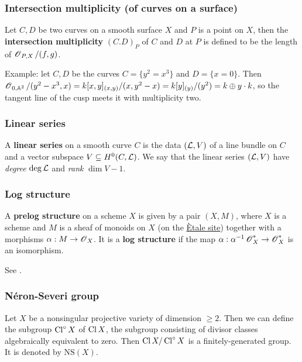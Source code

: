 \documentclass[11pt, english]{article}
\begin{document}
\subsubsection{Intersection multiplicity (of curves on a surface)}
\label{intersectionmult}

Let $C,D$ be two curves on a smooth surface $X$ and $P$ is a point on $X$, then the \textbf{intersection multiplicity} $(C.D)_P$ of $C$ and $D$ at $P$ is defined to be the length of $\operatorname{\mathscr{O}}_{P,X}/(f,g)$.

Example: let $C,D$ be the curves $C= \{ y^2=x^3 \}$ and $D = \{x = 0\}$. Then $\operatorname{\mathscr{O}}_{0,\mathbb{A}^2}/(y^2-x^3,x) = k[x,y]_{(x,y)}/(x,y^2-x)=k[y]_{(y)} /(y^2)=k \oplus y \cdot k$, so the tangent line of the cusp meets it with multiplicity two.


\subsubsection{Linear series}
\label{linearseries}

A \textbf{linear series} on a smooth curve $C$ is the data $(\mathcal{L},V)$ of a line bundle on $C$ and a vector subspace $V \subseteq H^0(C,\mathcal{L})$. We say that the linear series $(\mathcal{L},V)$ have \emph{degree} $\deg \mathcal{L}$ and \emph{rank} $\dim V - 1$. 

\subsubsection{Log structure}
\label{logstructure}

A \textbf{prelog structure} on a scheme $X$ is given by a pair $(X,M)$, where $X$ is a scheme and $M$ is a sheaf of monoids on $X$ (on the \hyperref[etalesite]{Ètale site}) together with a morphisms $\alpha:M \to \operatorname{\mathscr{O}}_X$. It is a \textbf{log structure} if the map $\alpha:\alpha^{-1}\operatorname{\mathscr{O}}_X^\ast \to \operatorname{\mathscr{O}}_X^\ast$ is an isomorphism.

See \cite{kato_log}.

\subsubsection{Néron-Severi group}
\label{neronseveri}

Let $X$ be a nonsingular projective variety of dimension $\geq 2$. Then we can define the subgroup $\operatorname{Cl}^\circ X $ of $\operatorname{Cl} X$, the subgroup consisting of divisor classes algebraically equivalent to zero. Then $\operatorname{Cl} X/\operatorname{Cl}^\circ X$ is a finitely-generated group. It is denoted by $\mathrm{NS}(X)$.
\end{document}
